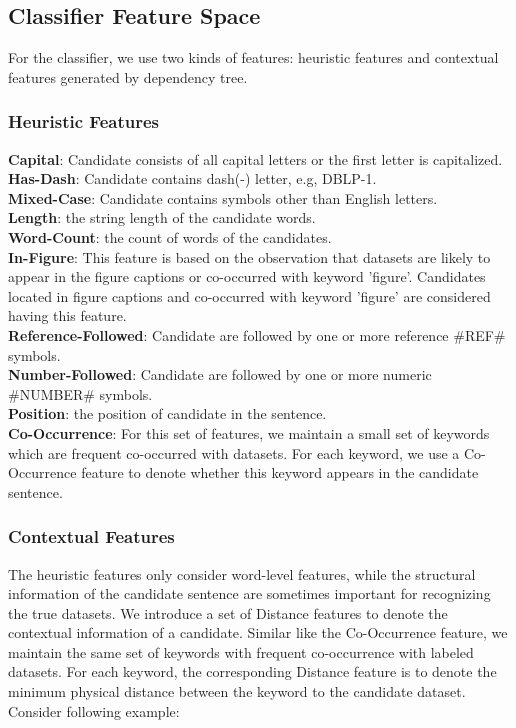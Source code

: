 \documentclass[10pt]{article}
\begin{document}
\subsection{Classifier Feature Space}
For the classifier, we use two kinds of features: heuristic features and contextual features generated by dependency tree. 

\subsubsection{Heuristic Features}

\noindent \textbf{Capital}: Candidate consists of all capital letters or the first letter is capitalized. \\
\noindent \textbf{Has-Dash}: Candidate contains dash(-) letter, e.g, DBLP-1. \\
\noindent \textbf{Mixed-Case}: Candidate contains symbols other than English letters. \\
\noindent \textbf{Length}: the string length of the candidate words. \\
\noindent \textbf{Word-Count}: the count of words of the candidates. \\
\noindent \textbf{In-Figure}: This feature is based on the observation that datasets are likely to appear in the figure captions or co-occurred with keyword 'figure'. Candidates located in figure captions and co-occurred with keyword 'figure' are considered having this feature. \\
\noindent \textbf{Reference-Followed}: Candidate are followed by one or more reference \#REF\# symbols. \\
\noindent \textbf{Number-Followed}: Candidate are followed by one or more numeric \#NUMBER\# symbols. \\
\noindent \textbf{Position}: the position of candidate in the sentence. \\
\noindent \textbf{Co-Occurrence}: For this set of features, we maintain a small set of keywords which are frequent co-occurred with datasets. For each keyword, we use a Co-Occurrence feature to denote whether this keyword appears in the candidate sentence. \\

\subsubsection{Contextual Features}
The heuristic features only consider word-level features, while the structural information of the candidate sentence are sometimes important for recognizing the true datasets. We introduce a set of Distance features to denote the contextual information of a candidate. Similar like the Co-Occurrence feature, we maintain the same set of keywords with frequent co-occurrence with labeled datasets. For each keyword, the corresponding Distance feature is to denote the minimum physical distance between the keyword to the candidate dataset. Consider following example: \\
\end{document}
